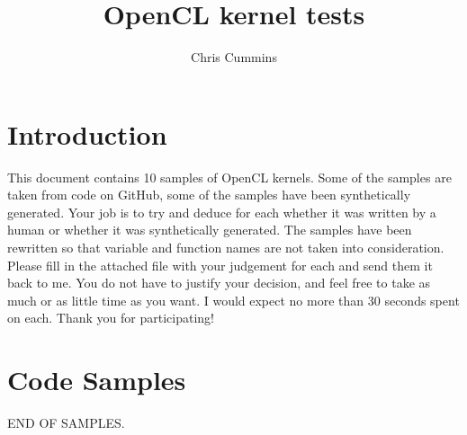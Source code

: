 \documentclass{article}
\begin{document}
\title{OpenCL kernel tests}
\author{Chris Cummins}

\maketitle

\section{Introduction} 

This document contains 10 samples of OpenCL kernels. Some of the samples are
taken from code on GitHub, some of the samples have been synthetically
generated. Your job is to try and deduce for each whether it was written by a
human or whether it was synthetically generated. The samples have been rewritten
so that variable and function names are not taken into consideration. Please
fill in the attached file \texttt{}with your judgement for each and
send them it back to me. You do not have to justify your decision, and feel free
to take as much or as little time as you want. I would expect no more than 30
seconds spent on each. Thank you for participating!

\section{Code Samples}

\lstset{language=[OpenCL]C}











\noindent END OF SAMPLES.
\end{document}
